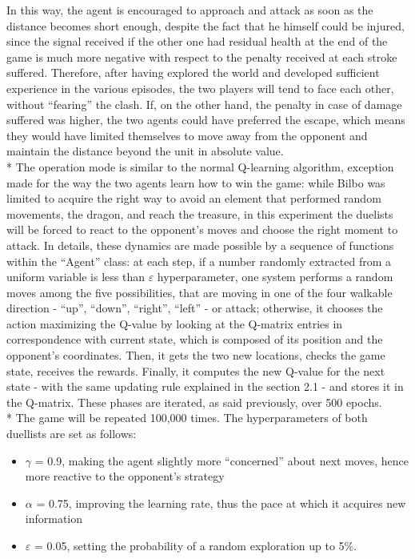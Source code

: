In this way, the agent is encouraged to approach and attack as soon as the distance becomes short enough, despite the fact that he himself could be injured, since the signal received if the other one had residual health at the end of the game is much more negative with respect to the penalty received at each stroke suffered. Therefore, after having explored the world and developed sufficient experience in the various episodes, the two players will tend to face each other, without ``fearing'' the clash. If, on the other hand, the penalty in case of damage suffered was higher, the two agents could have preferred the escape, which means they would have limited themselves to move away from the opponent and maintain the distance beyond the unit in absolute value.\\*
The operation mode is similar to the normal Q-learning algorithm, exception made for the way the two agents learn how to win the game: while Bilbo was limited to acquire the right way to avoid an element that performed random movements, the dragon, and reach the treasure, in this experiment the duelists will be forced to react to the opponent's moves and choose the right moment to attack. In details, these dynamics are made possible by a sequence of functions within the ``Agent'' class:  at each step, if a number randomly extracted from a uniform variable is less than $\varepsilon$ hyperparameter, one system performs a random moves among the five possibilities, that are moving in one of the four walkable direction - ``up'', ``down'', ``right'', ``left'' - or attack; otherwise, it chooses the action maximizing the Q-value by looking at the Q-matrix entries in correspondence with current state, which is composed of its position and the opponent's coordinates. Then, it gets the two new locations, checks the game state, receives the rewards. Finally, it computes the new Q-value for the next state - with the same updating rule explained in the section 2.1 - and stores it in the Q-matrix. These phases are iterated, as said previously, over 500 epochs.\\*
The game will be repeated 100,000 times. The hyperparameters of both duellists are set as follows:
\begin{itemize}[noitemsep, topsep=0ex]
  \item $\gamma$ = 0.9, making the agent slightly more ``concerned'' about next moves, hence more reactive to the opponent's strategy
  \item $\alpha$ = 0.75, improving the learning rate, thus the pace at which it acquires new information
  \item $\varepsilon$ = 0.05, setting the probability of a random exploration up to 5\%.
\end{itemize} 
